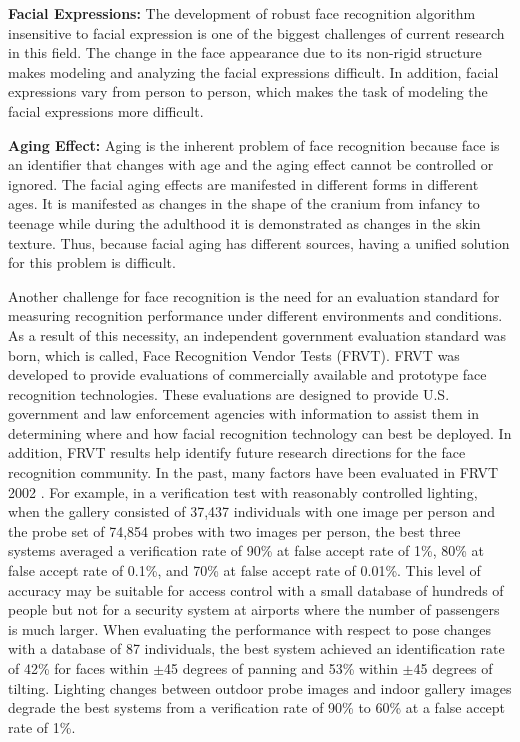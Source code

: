 \item\textbf{Facial Expressions:} The development of robust face recognition
algorithm insensitive to facial expression is one of the biggest
challenges of current research in this field. The change in the face
appearance due to its non-rigid structure makes modeling and
analyzing the facial expressions difficult. In addition, facial
expressions vary from person to person, which makes the task of
modeling the facial expressions more difficult.

\item\textbf{Aging Effect:} Aging is the inherent problem of face recognition
because face is an identifier that changes with age and the aging
effect cannot be controlled or ignored. The facial aging effects are
manifested in different forms in different ages. It is manifested as
changes in the shape of the cranium from infancy to teenage while
during the adulthood it is demonstrated as changes in the skin
texture. Thus, because facial aging has different sources, having a
unified solution for this problem is difficult. \ei

Another challenge for face recognition is the need for an evaluation
standard for measuring recognition performance under different
environments and conditions. As a result of this necessity, an
independent government evaluation standard was born, which is
called, Face Recognition Vendor Tests (FRVT). FRVT was developed to
provide evaluations of commercially available and prototype face
recognition technologies. These evaluations are designed to provide
U.S. government and law enforcement agencies with information to
assist them in determining where and how facial recognition
technology can best be deployed. In addition, FRVT results help
identify future research directions for the face recognition
community. In the past, many factors have been evaluated in FRVT
2002 \cite{FRVT2002}. For example, in a verification test with
reasonably controlled lighting, when the gallery consisted of 37,437
individuals with one image per person and the probe set of 74,854
probes with two images per person, the best three systems averaged a
verification rate of 90\% at false accept rate of 1\%, 80\% at false
accept rate of 0.1\%, and 70\% at false accept rate of 0.01\%. This
level of accuracy may be suitable for access control with a small
database of hundreds of people but not for a security system at
airports where the number of passengers is much larger. When
evaluating the performance with respect to pose changes with a
database of 87 individuals, the best system achieved an
identification rate of 42\% for faces within $\pm$45 degrees of
panning and 53\% within $\pm$45 degrees of tilting. Lighting changes
between outdoor probe images and indoor gallery images degrade the
best systems from a verification rate of 90\% to 60\% at a false
accept rate of 1\%.

